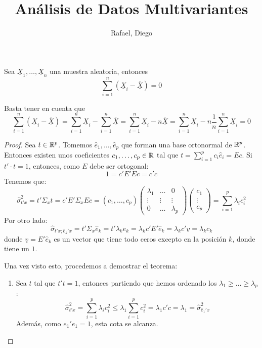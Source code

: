 \documentclass[twoside]{article}
\newcommand{\x}{\underline{X}}
\renewcommand{\X}{\overline{\underline{X}}}
\begin{document}
\title{Análisis de Datos Multivariantes}
\author{Rafael, Diego}
\maketitle
\begin{ejercicio}{1} Sea $\x_1,\dotsc,\x_n$ una muestra aleatoria, entonces
$$
\sum_{i=1}^n (\x_i-\X) = 0
$$
\end{ejercicio}
\begin{solucion}
Basta tener en cuenta que 
$$
\sum_{i=1}^n (\x_i-\X) = \sum_{i=1}^n \x_i - \sum_{i=1}^n \X = \sum_{i=1}^n \x_i  - n \X = \sum_{i=1}^n \x_i  - n \frac{1}{n} \sum_{i=1}^n \x_i  =0
$$
\end{solucion}

\begin{proof}
Sea $t \in \mathbb{R}^p$. Tomemos $\hat{e}_1,\dots,\hat{e}_p$ que forman una base ortonormal de $\mathbb{R}^p$.
Entonces existen unos coeficientes $c_1,\dots,c_p \in \mathbb{R}$ tal que $t = \sum_{i=1}^p c_i \hat{e}_i = E c$.
Si $t' \cdot t = 1$, entonces, como $E$ debe ser ortogonal:
\[ 1 = c' E' E c = c' c \]
Tenemos que:
\[ \hat{\sigma}^2_{t'x} = t' \Sigma_x t = c' E' \Sigma_x E c = (c_1,\dots,c_p) \begin{pmatrix}\lambda_1 & \dots & 0\\\vdots & \vdots & \vdots\\0 & \dots & \lambda_p\end{pmatrix}\begin{pmatrix}c_1\\\vdots\\c_p\end{pmatrix} = \sum_{i=1}^p \lambda_i c_i^2 \]
Por otro lado:
\begin{equation}\label{cov-autov} \hat{\sigma}_{t'x;\hat{e}_k'x} = t' \Sigma_x \hat{e}_k = t' \lambda_k \hat{e}_k = \lambda_k c' E' \hat{e}_k = \lambda_k c' \underline{v} = \lambda_k c_k \end{equation}
donde $\underline{v} = E' \hat{e}_k$ es un vector que tiene todo ceros excepto en la posición $k$, donde tiene un $1$.

Una vez visto esto, procedemos a demostrar el teorema:
\begin{enumerate}
\item Sea $t$ tal que $t't=1$, entonces partiendo que hemos ordenado los $\lambda_1 \geq \dots \geq \lambda_p$:
\[ \hat{\sigma}^2_{t'x} = \sum_{i=1}^p \lambda_i c_i^2 \leq \lambda_1 \sum_{i=1}^p c_i^2 = \lambda_1 c' c = \lambda_1 = \hat{\sigma}_{\hat{e}_1'x}^2\]
Además, como $e_1'e_1 = 1$, esta cota se alcanza.
\qedhere


\end{enumerate}
\end{proof}
\end{document}
